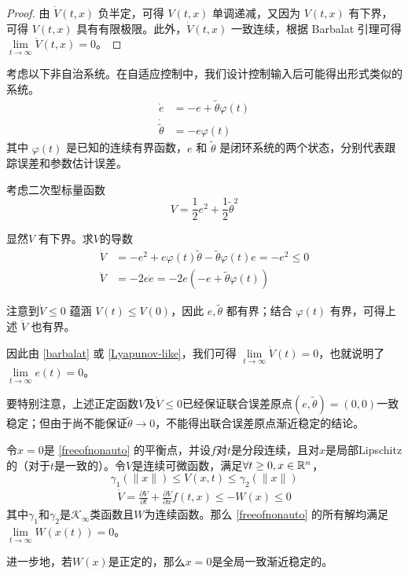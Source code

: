 \begin{proof}
  由 $\dot{V}(t, x)$ 负半定，可得 $V (t, x)$ 单调递减，又因为 $V(t, x)$ 有下界，可得 $V (t, x)$ 具有有限极限。此外，$\dot{V}(t, x)$ 一致连续，根据 Barbalat 引理可得 $\lim\limits_{t \to \infty} \dot{V}(t, x) = 0$。
\end{proof}
\begin{example}
  考虑以下非自治系统。在自适应控制中，我们设计控制输入后可能得出形式类似的系统。
  \begin{align*}
    \dot{e} & = - e + \tilde{\theta} \varphi (t)\\
    \dot{\tilde{\theta}} & = - e \varphi (t)
  \end{align*}
  其中 $\varphi (t)$ 是已知的连续有界函数，$e$ 和 $\tilde{\theta}$ 是闭环系统的两个状态，分别代表跟踪误差和参数估计误差。
  
  考虑二次型标量函数 \[V = \frac{1}{2} e^2 + \frac{1}{2} \tilde{\theta}^2\]
  
  显然$V$ 有下界。求$V$的导数
  \begin{align*}
    \dot{V} &= - e^2+e\varphi(t)\tilde{\theta}-\tilde{\theta}\varphi(t)e= - e^2 \leq 0 \\
    \ddot{V} &= - 2 e  \dot{e} = - 2 e (- e + \tilde{\theta} \varphi (t))
  \end{align*}
  
  注意到$\dot{V} \leq 0$ 蕴涵 $V (t) \leq V (0)$，因此 $e, \tilde{\theta}$ 都有界；结合  
   $\varphi (t)$ 有界，可得上述 $\ddot{V}$ 也有界。
  
  因此由 \ref{barbalat} 或 \ref{Lyapunov-like}，我们可得 $\lim\limits_{t \rightarrow\infty} \dot{V} (t) = 0$，也就说明了 $\lim\limits_{t \rightarrow \infty} e (t) = 0$。

  \begin{note}
    要特别注意，上述正定函数$V$及$\dot{V}\le0$已经保证联合误差原点$(e,\tilde{\theta})=(0,0)$一致稳定；但由于尚不能保证$\tilde{\theta}\to0$，不能得出联合误差原点渐近稳定的结论。
  \end{note}
\end{example}
\begin{theorem}\label{LaSalle-Yoshizawa}
    令$x=0$是 \eqref{freeofnonauto} 的平衡点，并设$f$对$t$是分段连续，且对$x$是局部Lipschitz的（对于$t$是一致的）。令$V$是连续可微函数，满足$\forall t\ge 0,x\in\mathbb{R}{}^n$，\[\gamma_1(\|x\|)\le V(x,t)\le \gamma_2(\|x\|)\]
    \[\begin{aligned}\dot{V}=\frac{\partial V}{\partial t}+\frac{\partial V}{\partial x}f(t,x)\leq-W(x)\leq0\end{aligned}\]
    其中$\gamma_1$和$\gamma_2$是$\mathcal{K}_\infty$类函数且$W$为连续函数。那么  \eqref{freeofnonauto} 的所有解均满足$\lim\limits_{t\to\infty}W(x(t))=0$。
    
    进一步地，若$W(x)$是正定的，那么$x=0$是全局一致渐近稳定的。
\end{theorem}
